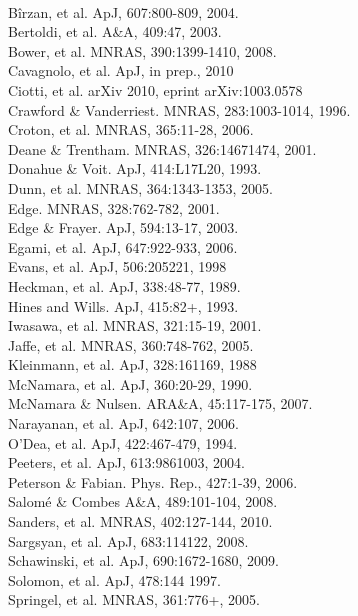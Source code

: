 \documentclass[11pt]{article}
\begin{document}
\clearpage
{}\\
B\^irzan, et al. ApJ, 607:800-809, 2004.\\
Bertoldi, et al. A\&A, 409:47, 2003.\\
Bower, et al. MNRAS, 390:1399-1410, 2008.\\
Cavagnolo, et al. ApJ, in prep., 2010\\
Ciotti, et al. arXiv 2010, eprint arXiv:1003.0578\\
Crawford \& Vanderriest. MNRAS, 283:1003-1014, 1996.\\
Croton, et al. MNRAS, 365:11-28, 2006.\\
Deane \& Trentham. MNRAS, 326:14671474, 2001.\\
Donahue \& Voit. ApJ, 414:L17L20, 1993.\\
Dunn, et al. MNRAS, 364:1343-1353, 2005.\\
Edge. MNRAS, 328:762-782, 2001.\\
Edge \& Frayer. ApJ, 594:13-17, 2003.\\
Egami, et al. ApJ, 647:922-933, 2006.\\
Evans, et al. ApJ, 506:205221, 1998\\
Heckman, et al. ApJ, 338:48-77, 1989.\\
Hines and Wills. ApJ, 415:82+, 1993.\\
Iwasawa, et al. MNRAS, 321:15-19, 2001.\\
Jaffe, et al. MNRAS, 360:748-762, 2005.\\
Kleinmann, et al. ApJ, 328:161169, 1988\\
McNamara, et al. ApJ, 360:20-29, 1990.\\
McNamara \& Nulsen. ARA\&A, 45:117-175, 2007.\\
Narayanan, et al. ApJ, 642:107, 2006.\\
O'Dea, et al. ApJ, 422:467-479, 1994.\\
Peeters, et al. ApJ, 613:9861003, 2004.\\
Peterson \& Fabian. Phys. Rep., 427:1-39, 2006.\\
Salom\'e \& Combes A\&A, 489:101-104, 2008.\\
Sanders, et al. MNRAS, 402:127-144, 2010.\\
Sargsyan, et al. ApJ, 683:114122, 2008.\\
Schawinski, et al. ApJ, 690:1672-1680, 2009.\\
Solomon, et al. ApJ, 478:144 1997.\\
Springel, et al. MNRAS, 361:776+, 2005.
\end{document}
